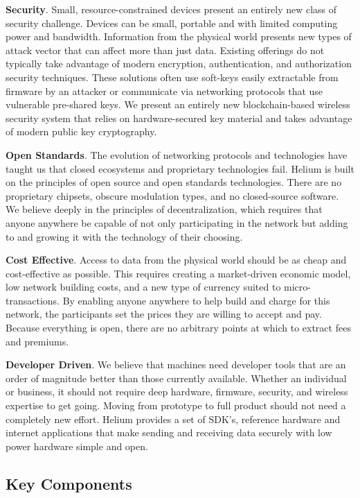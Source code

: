 \documentclass[10pt, nonatbib, nocopyrightspace, reprint]{sigplanconf}
\begin{document}
\textbf{Security}. Small, resource-constrained devices present an entirely new class of security challenge. Devices can be small, portable and with limited computing power and bandwidth. Information from the physical world presents new types of attack vector that can affect more than just data. Existing offerings do not typically take advantage of modern encryption, authentication, and authorization security techniques. These solutions often use soft-keys easily extractable from firmware by an attacker or communicate via networking protocols that use vulnerable pre-shared keys. We present an entirely new blockchain-based wireless security system that relies on hardware-secured key material and takes advantage of modern public key cryptography.

\textbf{Open Standards}. The evolution of networking protocols and technologies have taught us that closed ecosystems and proprietary technologies fail. Helium is built on the principles of open source and open standards technologies. There are no proprietary chipsets, obscure modulation types, and no closed-source software. We believe deeply in the principles of decentralization, which requires that anyone anywhere be capable of not only participating in the network but adding to and growing it with the technology of their choosing.

\textbf{Cost Effective}. Access to data from the physical world should be as cheap and cost-effective as possible. This requires creating a market-driven economic model, low network building costs, and a new type of currency suited to micro-transactions. By enabling anyone anywhere to help build and charge for this network, the participants set the prices they are willing to accept and pay. Because everything is open, there are no arbitrary points at which to extract fees and premiums.

\textbf{Developer Driven}. We believe that machines need developer tools that are an order of magnitude better than those currently available. Whether an individual or business, it should not require deep hardware, firmware, security, and wireless expertise to get going. Moving from prototype to full product should not need a completely new effort. Helium provides a set of SDK's, reference hardware and internet applications that make sending and receiving data securely with low power hardware simple and open.

\subsection{Key Components}
\end{document}
